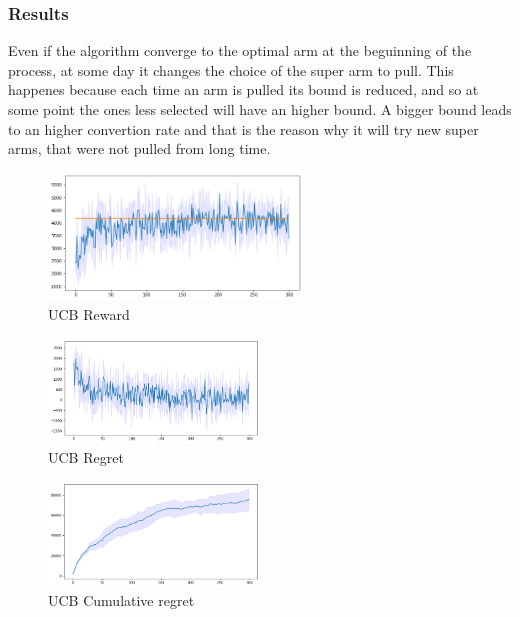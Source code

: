 \subsubsection{Results}
Even if the algorithm converge to the optimal arm at the beguinning of the process, at some day it changes the choice of the super arm to pull. This happenes because each time an arm is pulled its bound is reduced, and so at some point the ones less selected will have an higher bound. A bigger bound leads to an higher convertion rate and that is the reason why it will try new super arms, that were not pulled from long time.
\begin{figure}[ht]
    \begin{center}
    \includegraphics[width=0.6\textwidth]{img/ucb3.png}
    \caption{UCB Reward}
    \label{fig:reward31}
    \end{center}
\end{figure}
\begin{multicols}{2}
    \begin{figure}[H]
        \begin{center}
        \includegraphics[width=0.5\textwidth]{img/ucb3_regret.png}
        \caption{UCB Regret}
        \label{fig:regret31}
        \end{center}
    \end{figure}
    \columnbreak
    \begin{figure}[H]
        \begin{center}
        \includegraphics[width=0.5\textwidth]{img/ucb3_cum_reg.png}
        \caption{UCB Cumulative regret}
        \label{fig:cum_reg31}
        \end{center}
    \end{figure}
\end{multicols}


